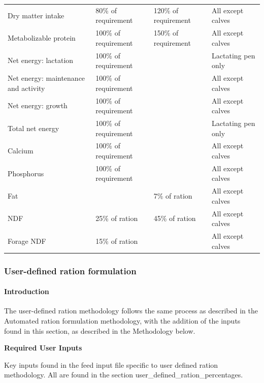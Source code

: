 \begin{refsection}
\begin{longtable}{@{} L{3.5cm} L{3cm} L{3cm} L{3cm} @{}}
Dry matter intake & 80\% of requirement & 120\% of requirement & All except calves \\
Metabolizable protein & 100\% of requirement & 150\% of requirement & All except calves \\
Net energy: lactation & 100\% of requirement &  & Lactating pen only \\
Net energy: maintenance and activity & 100\% of requirement &  & All except calves \\
Net energy: growth & 100\% of requirement &  & All except calves \\
Total net energy & 100\% of requirement &  & Lactating pen only \\
Calcium & 100\% of requirement &  & All except calves \\
Phosphorus & 100\% of requirement &  & All except calves \\
Fat &  & 7\% of ration & All except calves \\
NDF & 25\% of ration & 45\% of ration & All except calves \\
Forage NDF & 15\% of ration &  & All except calves \\



\end{longtable}






\subsubsection{User-defined ration formulation}
\vspace{0.3cm}

\paragraph{Introduction}
The user-defined ration methodology follows the same process as described in the Automated ration formulation methodology, with the addition of the inputs found in this section, as described in the Methodology below.

\textbf{Required User Inputs}

\begin{landscape}
\thispagestyle{empty}

\begin{table}[h!]
\caption{Key inputs found in the feed input file specific to user defined ration methodology. All are found in the section user\_defined\_ration\_percentages.}
\centering
\renewcommand{\arraystretch}{1.4}


\end{table}
\end{landscape}
\end{refsection}

